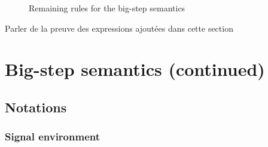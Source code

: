 \documentclass[9pt,preprint]{sigplanconf}
\newcommand{\todo}[1]{ {\color{red} #1}}
\begin{document}


\appendix

%

\begin{figure*}[t]


\caption{Remaining rules for the big-step semantics}
\label{fig:big_step_other}
\end{figure*}

\todo{Parler de la preuve des expressions ajoutées dans cette section}

\section{Big-step semantics (continued)}
\label{sec:big_step_other}

\subsection{Notations}

\subsubsection*{Signal environment}
\end{document}

